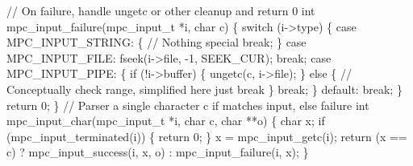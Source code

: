 \documentclass[
  a4paper,
]{scrreprt}
\newenvironment{Shaded}{\begin{snugshade}}{\end{snugshade}}
\newcommand{\CommentTok}[1]{\textcolor[rgb]{0.41,0.41,0.41}{#1}}
\newcommand{\ControlFlowTok}[1]{\textcolor[rgb]{0.85,0.12,0.09}{#1}}
\newcommand{\DataTypeTok}[1]{\textcolor[rgb]{0.47,0.16,0.63}{#1}}
\newcommand{\DecValTok}[1]{\textcolor[rgb]{0.47,0.16,0.63}{#1}}
\newcommand{\NormalTok}[1]{\textcolor[rgb]{0.33,0.33,0.33}{#1}}
\newcommand{\OperatorTok}[1]{\textcolor[rgb]{0.00,0.46,0.62}{#1}}
\theoremstyle{definition}
\theoremstyle{remark}
\begin{document}
\begin{Shaded}
\begin{Highlighting}[numbers=left,,]
\CommentTok{// On failure, handle ungetc or other cleanup and return 0}
\DataTypeTok{int}\NormalTok{ mpc\_input\_failure}\OperatorTok{(}\NormalTok{mpc\_input\_t }\OperatorTok{*}\NormalTok{i}\OperatorTok{,} \DataTypeTok{char}\NormalTok{ c}\OperatorTok{)} \OperatorTok{\{}
  \ControlFlowTok{switch} \OperatorTok{(}\NormalTok{i}\OperatorTok{{-}\textgreater{}}\NormalTok{type}\OperatorTok{)} \OperatorTok{\{}
    \ControlFlowTok{case}\NormalTok{ MPC\_INPUT\_STRING}\OperatorTok{:} \OperatorTok{\{}
      \CommentTok{// Nothing special}
      \ControlFlowTok{break}\OperatorTok{;}
    \OperatorTok{\}}
    \ControlFlowTok{case}\NormalTok{ MPC\_INPUT\_FILE}\OperatorTok{:}
\NormalTok{      fseek}\OperatorTok{(}\NormalTok{i}\OperatorTok{{-}\textgreater{}}\NormalTok{file}\OperatorTok{,} \OperatorTok{{-}}\DecValTok{1}\OperatorTok{,}\NormalTok{ SEEK\_CUR}\OperatorTok{);}
      \ControlFlowTok{break}\OperatorTok{;}
    \ControlFlowTok{case}\NormalTok{ MPC\_INPUT\_PIPE}\OperatorTok{:} \OperatorTok{\{}
      \ControlFlowTok{if} \OperatorTok{(!}\NormalTok{i}\OperatorTok{{-}\textgreater{}}\NormalTok{buffer}\OperatorTok{)} \OperatorTok{\{}\NormalTok{ ungetc}\OperatorTok{(}\NormalTok{c}\OperatorTok{,}\NormalTok{ i}\OperatorTok{{-}\textgreater{}}\NormalTok{file}\OperatorTok{);} \OperatorTok{\}}
      \ControlFlowTok{else} \OperatorTok{\{}
        \CommentTok{// Conceptually check range, simplified here just break}
      \OperatorTok{\}}
      \ControlFlowTok{break}\OperatorTok{;}
    \OperatorTok{\}}
    \ControlFlowTok{default}\OperatorTok{:} \ControlFlowTok{break}\OperatorTok{;}
  \OperatorTok{\}}
  \ControlFlowTok{return} \DecValTok{0}\OperatorTok{;}
\OperatorTok{\}}
\CommentTok{// Parser a single character c if matches input, else failure}
\DataTypeTok{int}\NormalTok{ mpc\_input\_char}\OperatorTok{(}\NormalTok{mpc\_input\_t }\OperatorTok{*}\NormalTok{i}\OperatorTok{,} \DataTypeTok{char}\NormalTok{ c}\OperatorTok{,} \DataTypeTok{char} \OperatorTok{**}\NormalTok{o}\OperatorTok{)} \OperatorTok{\{}
  \DataTypeTok{char}\NormalTok{ x}\OperatorTok{;}
  \ControlFlowTok{if} \OperatorTok{(}\NormalTok{mpc\_input\_terminated}\OperatorTok{(}\NormalTok{i}\OperatorTok{))} \OperatorTok{\{} \ControlFlowTok{return} \DecValTok{0}\OperatorTok{;} \OperatorTok{\}}
\NormalTok{  x }\OperatorTok{=}\NormalTok{ mpc\_input\_getc}\OperatorTok{(}\NormalTok{i}\OperatorTok{);}
  \ControlFlowTok{return} \OperatorTok{(}\NormalTok{x }\OperatorTok{==}\NormalTok{ c}\OperatorTok{)} \OperatorTok{?}\NormalTok{ mpc\_input\_success}\OperatorTok{(}\NormalTok{i}\OperatorTok{,}\NormalTok{ x}\OperatorTok{,}\NormalTok{ o}\OperatorTok{)} \OperatorTok{:}\NormalTok{ mpc\_input\_failure}\OperatorTok{(}\NormalTok{i}\OperatorTok{,}\NormalTok{ x}\OperatorTok{);}
\OperatorTok{\}}


\end{Highlighting}
\end{Shaded}
\end{document}
